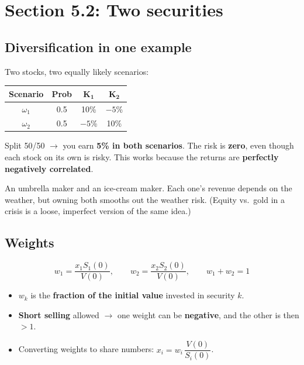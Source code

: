 \documentclass[titlepage,11pt,a4paper]{article}
\begin{document}
\section{Section 5.2: Two securities}

\subsection{Diversification in one example}
Two stocks, two equally likely scenarios:

\begin{center}\renewcommand{\arraystretch}{1.25}
\begin{tabular}{cccc}
\toprule
\textbf{\color{mycyan}Scenario} & \textbf{\color{mycyan}Prob} & $\boldsymbol{K_1}$ & $\boldsymbol{K_2}$\\
\midrule
$\omega_1$ & 0.5 & 10\% & $-5$\%\\
$\omega_2$ & 0.5 & $-5$\% & 10\%\\
\bottomrule
\end{tabular}
\end{center}

Split 50/50 $\to$ you earn \textbf{5\% in both scenarios}. The risk is \textbf{zero}, even though each stock on its own is risky. This works because the returns are \textbf{perfectly negatively correlated}.

\begin{practice}
An umbrella maker and an ice-cream maker. Each one's revenue depends on the weather, but owning both smooths out the weather risk. (Equity vs.\ gold in a crisis is a loose, imperfect version of the same idea.)
\end{practice}

\subsection{Weights}

\begin{result}
\[w_1=\frac{x_1S_1(0)}{V(0)},\qquad w_2=\frac{x_2S_2(0)}{V(0)},\qquad w_1+w_2=1 \tag{5.1}\]
\end{result}

\begin{itemize}
  \item $w_k$ is the \textbf{fraction of the initial value} invested in security $k$.
  \item \textbf{Short selling} allowed $\to$ one weight can be \textbf{negative}, and the other is then $>1$.
  \item Converting weights to share numbers: $x_i=w_i\,\dfrac{V(0)}{S_i(0)}$.
\end{itemize}
\end{document}
